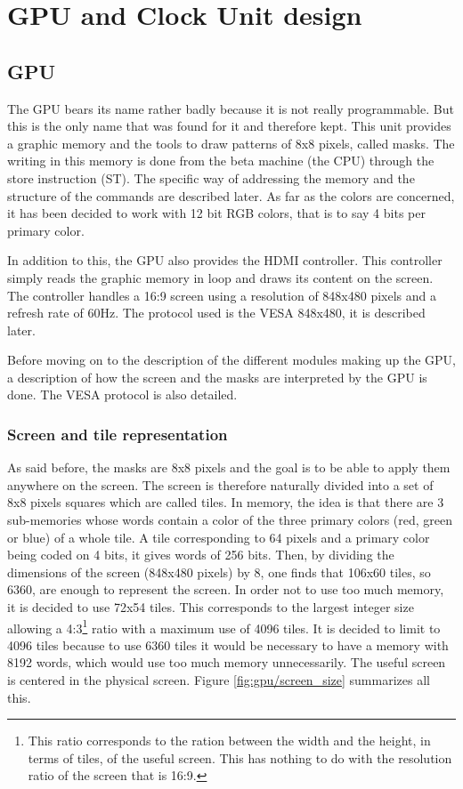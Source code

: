 \chapter{GPU and Clock Unit design}

\section{GPU}
The GPU bears its name rather badly because it is not really programmable. But this is the only name 
that was found for it and therefore kept. This unit provides a 
graphic memory and the tools to draw patterns of 8x8 pixels, called masks. The writing in this 
memory is done from the beta machine (the CPU) through the store instruction (ST). The specific way 
of addressing the memory and the structure of the commands are described later. As far as the colors 
are concerned, it has been decided to work with 12 bit RGB colors, that is to say 4 bits per primary 
color.

In addition to this, the GPU also provides the HDMI controller. This controller simply reads the 
graphic memory in loop and draws its content on the screen. The controller handles a 
16:9 screen using a resolution of 848x480 pixels and a refresh rate of 60Hz. The protocol used is 
the VESA 848x480, it is described later. 

Before moving on to the description of the different modules making up the GPU, a description of 
how the screen and the masks are interpreted by the GPU is done. The VESA protocol is also detailed.

\subsection{Screen and tile representation}

As said before, the masks are 8x8 pixels and the goal is to be able to apply them anywhere on the 
screen. 
The screen is therefore naturally divided into a set of 8x8 pixels squares which are called tiles. 
In memory, the idea is that there are 3 sub-memories whose words contain a color of the three 
primary colors (red, green or blue) of a whole tile. A tile corresponding to 64 pixels and a 
primary color being coded on 4 bits, it gives words of 256 bits. Then, by dividing the dimensions 
of the screen (848x480 pixels) by 8, one finds that 106x60 tiles, so 6360, are enough to represent 
the screen. In order not to use too much memory, it is decided to use 72x54 tiles. This corresponds 
to the largest integer size allowing a 4:3\footnote{This ratio corresponds to the ration between the
width and the height, in terms of tiles, of the useful screen. This has nothing to do with the 
resolution ratio of the screen that is 16:9.} ratio with a maximum use of 4096 tiles.  It is decided 
to limit to 4096 tiles because to use 6360 tiles it would be necessary to have a memory with 8192 
words, which would use too much memory unnecessarily. The useful screen is centered in the physical 
screen. Figure \ref{fig:gpu/screen_size} summarizes all this.

